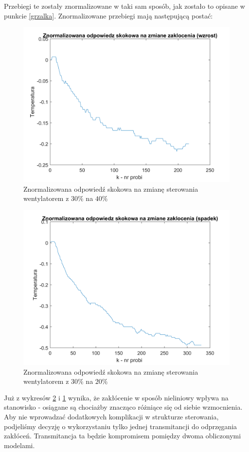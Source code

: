 \documentclass[12pt, a4paper]{article}
\begin{document}
Przebiegi te zostały znormalizowane w taki sam sposób, jak zostało to opisane w punkcie \ref{grzalka}. Znormalizowane przebiegi mają następującą postać:
\begin{figure}[H]
	\centering
	\includegraphics[width=0.9\linewidth]{nor_od_skok_wg}
	\caption{Znormalizowana odpowiedź skokowa na zmianę sterowania wentylatorem z $30\%$ na $40\%$}
	\label{fig:noswg}
\end{figure}
\begin{figure}[H]
	\centering
	\includegraphics[width=0.9\linewidth]{nor_od_skok_wd}
	\caption{Znormalizowana odpowiedź skokowa na zmianę sterowania wentylatorem z $30\%$ na $20\%$}
	\label{fig:noswd}
\end{figure}
Już z wykresów \ref{fig:noswd} i \ref{fig:noswg} wynika, że zakłócenie w sposób nieliniowy wpływa na stanowisko - osiągane są chociażby znacząco różniące się od siebie wzmocnienia. Aby nie wprowadzać dodatkowych komplikacji w strukturze sterowania, podjeliśmy decyzję o wykorzystaniu tylko jednej transmitancji do odprzęgania zakłóceń. Transmitancja ta będzie kompromisem pomiędzy dwoma obliczonymi modelami. 
\end{document}
